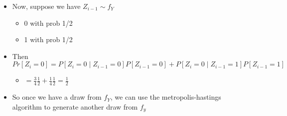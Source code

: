 \begin{itemize}
\begin{itemize}
\begin{itemize}
\end{itemize}
\end{itemize}
\item Now, suppose we have $Z_{i-1} \sim f_Y$
\begin{itemize}
\item 0 with prob 1/2
\item 1 with prob 1/2
\end{itemize}
\item Then $Pr[Z_i = 0] = P[Z_i = 0 \mid Z_{i-1}=0] P[Z_{i-1} = 0] + P[Z_i = 0 \mid Z_{i-1}=1] P[Z_{i-1} = 1]$
\begin{itemize}
\item $= \frac{3}{4} \frac{1}{2} + \frac{1}{4} \frac{1}{2} = \frac12$
\end{itemize}
\item So once we have a draw from $f_Y$, we can use the
        metropolis-hastings algorithm to generate another draw from $f_y$
\end{itemize}

